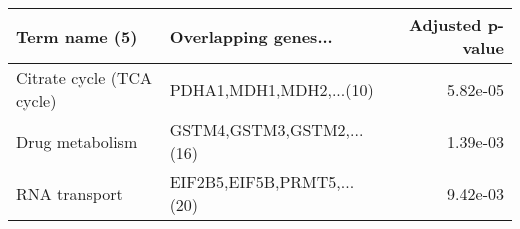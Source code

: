 \begin{tabular}{llr}
\toprule
            Term name (5) &       Overlapping genes... &  Adjusted p-value \\
\midrule
Citrate cycle (TCA cycle) &    PDHA1,MDH1,MDH2,...(10) &          5.82e-05 \\
          Drug metabolism &  GSTM4,GSTM3,GSTM2,...(16) &          1.39e-03 \\
            RNA transport & EIF2B5,EIF5B,PRMT5,...(20) &          9.42e-03 \\
\bottomrule
\end{tabular}
